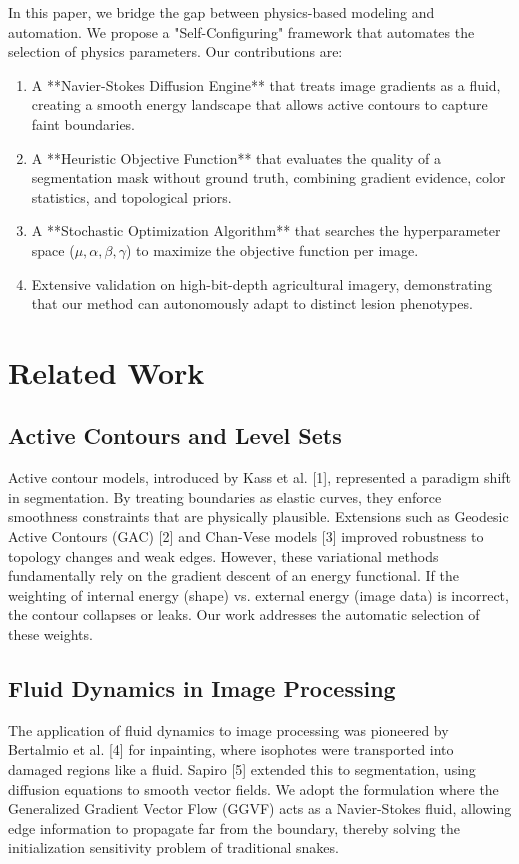 \documentclass[journal]{IEEEtran}
\begin{document}
In this paper, we bridge the gap between physics-based modeling and automation. We propose a "Self-Configuring" framework that automates the selection of physics parameters. Our contributions are:
\begin{enumerate}
    \item A **Navier-Stokes Diffusion Engine** that treats image gradients as a fluid, creating a smooth energy landscape that allows active contours to capture faint boundaries.
    \item A **Heuristic Objective Function** that evaluates the quality of a segmentation mask without ground truth, combining gradient evidence, color statistics, and topological priors.
    \item A **Stochastic Optimization Algorithm** that searches the hyperparameter space ($\mu, \alpha, \beta, \gamma$) to maximize the objective function per image.
    \item Extensive validation on high-bit-depth agricultural imagery, demonstrating that our method can autonomously adapt to distinct lesion phenotypes.
\end{enumerate}

\section{Related Work}

\subsection{Active Contours and Level Sets}
Active contour models, introduced by Kass et al. [1], represented a paradigm shift in segmentation. By treating boundaries as elastic curves, they enforce smoothness constraints that are physically plausible. Extensions such as Geodesic Active Contours (GAC) [2] and Chan-Vese models [3] improved robustness to topology changes and weak edges. However, these variational methods fundamentally rely on the gradient descent of an energy functional. If the weighting of internal energy (shape) vs. external energy (image data) is incorrect, the contour collapses or leaks. Our work addresses the automatic selection of these weights.

\subsection{Fluid Dynamics in Image Processing}
The application of fluid dynamics to image processing was pioneered by Bertalmio et al. [4] for inpainting, where isophotes were transported into damaged regions like a fluid. Sapiro [5] extended this to segmentation, using diffusion equations to smooth vector fields. We adopt the formulation where the Generalized Gradient Vector Flow (GGVF) acts as a Navier-Stokes fluid, allowing edge information to propagate far from the boundary, thereby solving the initialization sensitivity problem of traditional snakes.
\end{document}
